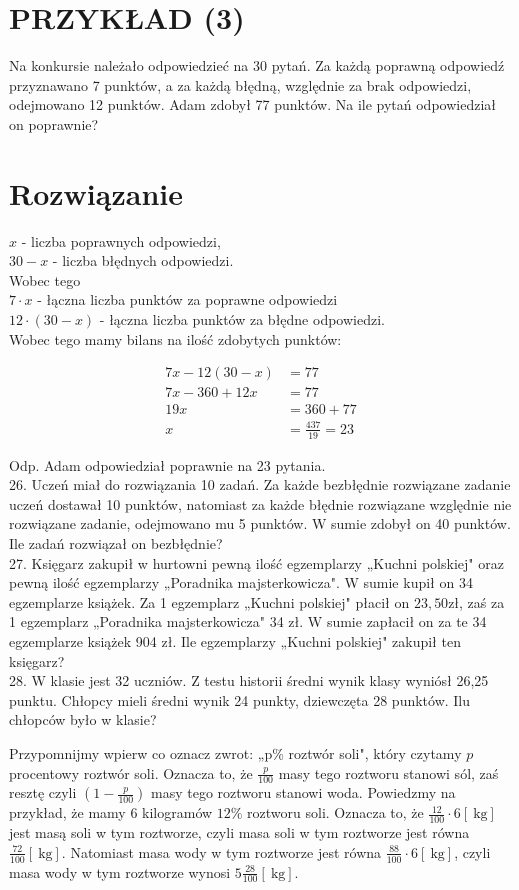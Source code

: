 \documentclass[10pt]{article}
\begin{document}
\section*{PRZYKŁAD (3)}
Na konkursie należało odpowiedzieć na 30 pytań. Za każdą poprawną odpowiedź przyznawano 7 punktów, a za każdą błędną, względnie za brak odpowiedzi, odejmowano 12 punktów. Adam zdobył 77 punktów. Na ile pytań odpowiedział on poprawnie?

\section*{Rozwiązanie}
\(x\) - liczba poprawnych odpowiedzi,\\
\(30-x\) - liczba błędnych odpowiedzi.\\
Wobec tego\\
\(7 \cdot x\) - łączna liczba punktów za poprawne odpowiedzi\\
\(12 \cdot(30-x)\) - łączna liczba punktów za błędne odpowiedzi.\\
Wobec tego mamy bilans na ilość zdobytych punktów:

\[
\begin{aligned}
7 x-12(30-x) & =77 \\
7 x-360+12 x & =77 \\
19 x & =360+77 \\
x & =\frac{437}{19}=23
\end{aligned}
\]

Odp. Adam odpowiedział poprawnie na 23 pytania.\\
26. Uczeń miał do rozwiązania 10 zadań. Za każde bezbłędnie rozwiązane zadanie uczeń dostawał 10 punktów, natomiast za każde błędnie rozwiązane względnie nie rozwiązane zadanie, odejmowano mu 5 punktów. W sumie zdobył on 40 punktów. Ile zadań rozwiązał on bezbłędnie?\\
27. Księgarz zakupił w hurtowni pewną ilość egzemplarzy „Kuchni polskiej" oraz pewną ilość egzemplarzy „Poradnika majsterkowicza". W sumie kupił on 34 egzemplarze książek. Za 1 egzemplarz „Kuchni polskiej" płacił on \(23,50 \mathrm{zł}\), zaś za 1 egzemplarz „Poradnika majsterkowicza" 34 zł. W sumie zapłacił on za te 34 egzemplarze książek 904 zł. Ile egzemplarzy „Kuchni polskiej" zakupił ten księgarz?\\
28. W klasie jest 32 uczniów. Z testu historii średni wynik klasy wyniósł 26,25 punktu. Chłopcy mieli średni wynik 24 punkty, dziewczęta 28 punktów. Ilu chłopców było w klasie?

Przypomnijmy wpierw co oznacz zwrot: „p\% roztwór soli", który czytamy \(p\) procentowy roztwór soli. Oznacza to, że \(\frac{p}{100}\) masy tego roztworu stanowi sól, zaś resztę czyli \(\left(1-\frac{p}{100}\right)\) masy tego roztworu stanowi woda. Powiedzmy na przykład, że mamy 6 kilogramów \(12 \%\) roztworu soli. Oznacza to, że \(\frac{12}{100} \cdot 6[\mathrm{~kg}]\) jest masą soli w tym roztworze, czyli masa soli w tym roztworze jest równa \(\frac{72}{100}[\mathrm{~kg}]\). Natomiast masa wody w tym roztworze jest równa \(\frac{88}{100} \cdot 6[\mathrm{~kg}]\), czyli masa wody w tym roztworze wynosi \(5 \frac{28}{100}[\mathrm{~kg}]\).
\end{document}

